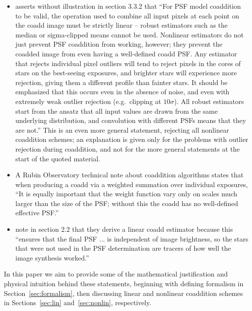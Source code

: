 \documentclass{openjournal}
\newcommand{\refresponse}[1]{#1}
\begin{document}
\begin{itemize}
\item \citet{2018PASJ...70S...5B} asserts without illustration in section 3.3.2 that ``For PSF model coaddition to be valid, the operation used to
combine all input pixels at each point on the coadd image must
be strictly linear –{} robust estimators such as the median or
sigma-clipped means cannot be used. Nonlinear estimators do
not just prevent PSF coaddition from working, however; they
prevent the coadded image from even having a well-defined coadd PSF. Any estimator that rejects individual pixel outliers will tend to reject pixels in the cores of stars on the best-seeing exposures, and brighter stars will experience more rejection, giving
them a different profile than fainter stars. It should be emphasized that this occurs even in the absence of noise, and even
with extremely weak outlier rejection (e.g.\ clipping at $10\sigma$). All
robust estimators start from the ansatz that all input values are
drawn from the same underlying distribution, and convolution
with different PSFs means that they are not.''   This is an even more general statement, rejecting all nonlinear coaddition schemes; an explanation is given only for the problems with outlier rejection during coaddition, and not for the more general statements at the start of the quoted material. 

\item A \refresponse{Rubin Observatory} technical note about coaddition algorithms \refresponse{\citep{DMTN015}} states that when producing a coadd via a weighted summation over individual exposures, ``It is equally important that the weight function vary only on scales much larger than the size of the PSF; without this the coadd has no well-defined effective PSF.''

\item \citet{2011ApJ...741...46R} note in section 2.2 that they derive a linear coadd estimator because this ``ensures that the final PSF ... is independent of image brightness, so the stars that were not used in the PSF determination are tracers of how well the image synthesis worked.''

\end{itemize}

In this paper we aim to provide some of the mathematical justification and physical intuition behind these statements, beginning with defining formalism in Section~\ref{sec:formalism}, then discussing linear and nonlinear coaddition schemes in Sections~\ref{sec:lin} and~\ref{sec:nonlin}, respectively.
\end{document}
